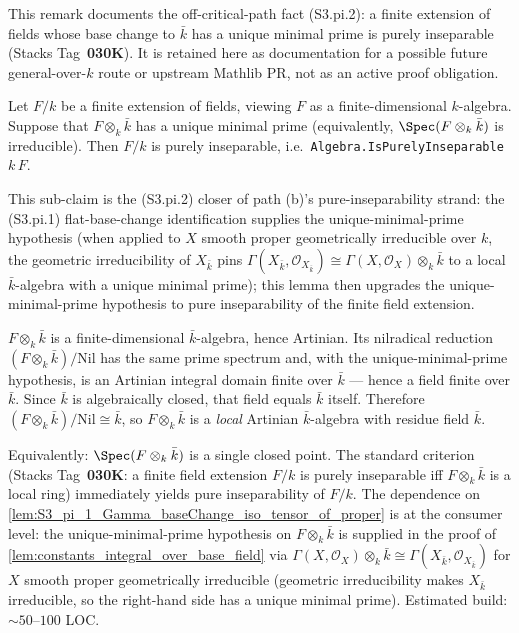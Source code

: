 \begin{remark}
  This remark documents the off-critical-path fact (S3.pi.2): a finite extension of fields whose base change to \(\bar k\) has a unique minimal prime is purely inseparable (Stacks Tag~\textbf{030K}). It is retained here as documentation for a possible future general-over-\(k\) route or upstream Mathlib PR, not as an active proof obligation.

  Let \(F / k\) be a finite extension of fields, viewing \(F\) as a finite-dimensional \(k\)-algebra. Suppose that \(F \otimes_k \bar k\) has a unique minimal prime (equivalently, \(\Spec(F \otimes_k \bar k)\) is irreducible). Then \(F / k\) is purely inseparable, i.e.\ \texttt{Algebra.IsPurelyInseparable}\,\(k\)\,\(F\).

  This sub-claim is the (S3.pi.2) closer of path (b)'s pure-inseparability strand: the (S3.pi.1) flat-base-change identification supplies the unique-minimal-prime hypothesis (when applied to \(X\) smooth proper geometrically irreducible over \(k\), the geometric irreducibility of \(X_{\bar k}\) pins \(\Gamma(X_{\bar k}, \mathcal O_{X_{\bar k}}) \cong \Gamma(X, \mathcal O_X) \otimes_k \bar k\) to a local \(\bar k\)-algebra with a unique minimal prime); this lemma then upgrades the unique-minimal-prime hypothesis to pure inseparability of the finite field extension.

  \(F \otimes_k \bar k\) is a finite-dimensional \(\bar k\)-algebra, hence Artinian. Its nilradical reduction \((F \otimes_k \bar k) / \mathrm{Nil}\) has the same prime spectrum and, with the unique-minimal-prime hypothesis, is an Artinian integral domain finite over \(\bar k\) --- hence a field finite over \(\bar k\). Since \(\bar k\) is algebraically closed, that field equals \(\bar k\) itself. Therefore \((F \otimes_k \bar k) / \mathrm{Nil} \cong \bar k\), so \(F \otimes_k \bar k\) is a \emph{local} Artinian \(\bar k\)-algebra with residue field \(\bar k\).

  Equivalently: \(\Spec(F \otimes_k \bar k)\) is a single closed point. The standard criterion (Stacks Tag~\textbf{030K}: a finite field extension \(F / k\) is purely inseparable iff \(F \otimes_k \bar k\) is a local ring) immediately yields pure inseparability of \(F / k\). The dependence on \cref{lem:S3_pi_1_Gamma_baseChange_iso_tensor_of_proper} is at the consumer level: the unique-minimal-prime hypothesis on \(F \otimes_k \bar k\) is supplied in the proof of \cref{lem:constants_integral_over_base_field} via \(\Gamma(X, \mathcal O_X) \otimes_k \bar k \cong \Gamma(X_{\bar k}, \mathcal O_{X_{\bar k}})\) for \(X\) smooth proper geometrically irreducible (geometric irreducibility makes \(X_{\bar k}\) irreducible, so the right-hand side has a unique minimal prime). Estimated build: \(\sim 50\)--\(100\) LOC.


\end{remark}
